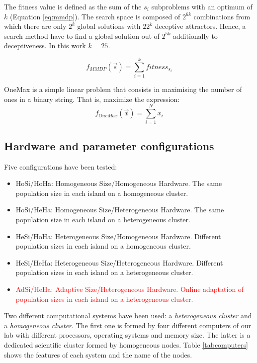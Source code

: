 \documentclass[final,1p,times]{elsarticle}
\begin{document}
The fitness value is defined as the sum of the $s_i$ subproblems with an optimum of $k$ (Equation \ref{eq:mmdp}).
The search space is composed of $2^{6k}$ combinations from which there
are only $2^k$ global solutions with $22^k$ deceptive
attractors. Hence, a search method have to find a global solution
out of $2^{5k}$ additionally to deceptiveness. In this work $k=25$. 

\begin{equation}\label{eq:mmdp}
f_{MMDP}(\vec s)= \sum_{i=1}^{k} fitness_{s_i}
\end{equation}

OneMax is a simple linear problem that consists in maximising the number of ones in a binary string. That is, maximize the expression:
\begin{equation}
f_{OneMax}(\vec{x}) = \sum_{i=1}^{N}{x_{i}}
\end{equation}

\subsection{Hardware and parameter configurations}

Five configurations have been tested:

\begin{itemize}
\item HoSi/HoHa: Homogeneous Size/Homogeneous Hardware. The same population size in each island on a homogeneous cluster.
\item HoSi/HeHa: Homogeneous Size/Heterogeneous Hardware. The same population size in each island on a heterogeneous cluster.
\item HeSi/HoHa: Heterogeneous Size/Homogeneous Hardware. Different population sizes in each island on a homogeneous cluster.
\item HeSi/HeHa: Heterogeneous Size/Heterogeneous Hardware. Different population sizes in each island on a heterogeneous cluster.
\item \textcolor{red}{AdSi/HeHa: Adaptive Size/Heterogeneous Hardware. Online adaptation of population sizes in each island on a heterogeneous cluster.}
\end{itemize}

Two different computational systems have been used: a {\em heterogeneous cluster} and a {\em homogeneous cluster}. The first one is formed by four different computers of our lab with different processors, operating systems and memory size. The latter is a dedicated scientific cluster formed by homogeneous nodes. Table \ref{tabcomputers} shows the features of each system and the name of the nodes.
\end{document}
